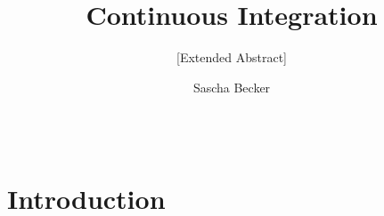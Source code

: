 \documentclass{sig-alternate-05-2015}
\begin{document}
\title{Continuous Integration}
\subtitle{[Extended Abstract]}


%
\author{
\alignauthor
Sascha Becker\\
       \\
       \\
}

\maketitle
\begin{abstract}

\end{abstract}

\printccsdesc



\section{Introduction}




\end{document}
